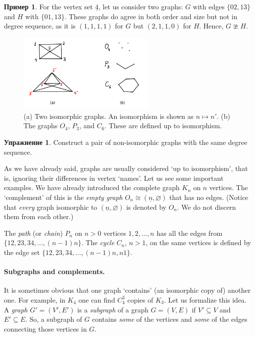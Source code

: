 \documentclass[12pt,notitlepage]{article}
\theoremstyle{plain}
\theoremstyle{definition}
\newtheorem{exc}[thm]{Упражнение}
\newtheorem{exm}[thm]{Пример}
\theoremstyle{plain}
\newcommand{\sbs}{\subseteq}
\newcommand{\void}{\varnothing}
\newcommand{\ul}[1]{\underline{#1}}
\newcommand{\1}{\mathbf{1}}
\newcommand{\0}{\mathbf{0}}
\begin{document}
\begin{exm}
	For the vertex set $\ul{4}$, let us consider two graphs: $G$ with edges $\{02, 13\}$ and $H$ with $\{01, 13\}$. These graphs do agree in both order and size but not in degree sequence, as it is $(1,1,1,1)$ for $G$ but $(2,1,1,0)$ for $H$. Hence, $G \ncong H$.
\end{exm}

\begin{figure}[h]
	\centering
	\includegraphics*[width=0.6\textwidth]{graph_iso.pdf}
	\caption{(a) Two isomorphic graphs. An isomorphism is shown as $n \mapsto n'$. (b) The graphs $O_4$, $P_3$, and $C_6$. These are defined up to isomorphism.}
\end{figure}

\begin{exc}
	Construct a pair of non-isomorphic graphs with the same degree sequence.
\end{exc}

As we have already said, graphs are usually considered `up to isomorphism', that is, ignoring their differences in vertex `names'. Let us see some important examples. We have already introduced the complete graph $K_n$ on $n$ vertices. The `complement' of this is the \emph{empty graph} $O_n \cong (\ul{n}, \void)$ that has no edges. (Notice that \emph{every} graph isomorphic to $(\ul{n}, \void)$ is denoted by $O_n$. We do not discern them from each other.)

The \emph{path} (or \emph{chain}) $P_n$ on $n > 0$ vertices $1, 2, \ldots, n$ has all the edges from $\{1 2, 2 3, 3 4, \ldots, (n - 1) n\}$. The \emph{cycle} $C_n$, $n > 1$, on the same vertices is defined by the edge set $\{1 2, 2 3, 3 4, \ldots, (n - 1) n, n 1\}$.

\paragraph{Subgraphs and complements.} It is sometimes obvious that one graph `contains' (an isomorphic copy of) another one. For example, in $K_4$ one can find $C_4^3$ copies of $K_3$. Let us formalize this idea. A \emph{graph} $G' = (V', E')$ is a \emph{subgraph} of a graph $G = (V, E)$ if $V' \sbs V$ and $E' \sbs E$. So, a subgraph of $G$ contains \emph{some} of the vertices and \emph{some} of the edges connecting those vertices in $G$.
\end{document}
